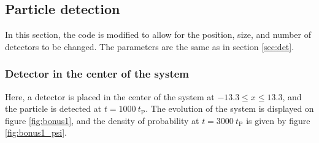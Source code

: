 \documentclass[a4paper,12pt,twoside]{article}
\newcommand{\bracket}[1]{\left(#1\right)}
\newcommand{\abs}[1]{\left|#1\right|}
\begin{document}
    
    \subsection{Particle detection}
    In this section, the code is modified to allow for the position, size, and number of detectors to be changed. The parameters are the same as in section \ref{sec:det}.
    
    \subsubsection{Detector in the center of the system}
    Here, a detector is placed in the center of the system at $-13.3\leq x \leq 13.3$, and the particle is detected at $t=1000~t_\text{P}$. The evolution of the system is displayed on figure \ref{fig:bonus1}, and the density of probability at $t=3000~t_\text{P}$ is given by figure \ref{fig:bonus1_psi}.
    
\end{document}
